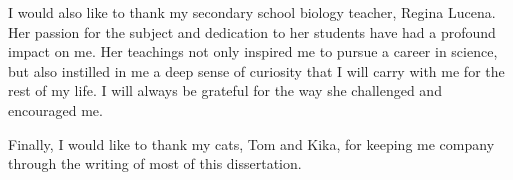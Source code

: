 I would also like to thank my secondary school biology teacher, Regina Lucena.
Her passion for the subject and dedication to her students have had a profound
impact on me. Her teachings not only inspired me to pursue a career in
science, but also instilled in me a deep sense of curiosity that I will carry
with me for the rest of my life. I will always be grateful for the way she
challenged and encouraged me.

Finally, I would like to thank my cats, Tom and Kika, for keeping me company
through the writing of most of this dissertation.
